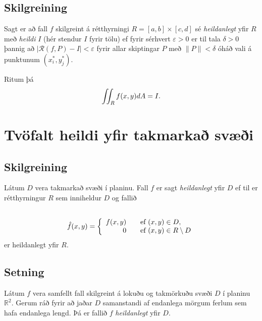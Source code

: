 \documentclass[a4paper,10pt,icelandic]{sphinxmanual}
\begin{document}
\subsection{Skilgreining}
\label{Kafli4:id2}
Sagt er að fall \(f\) skilgreint á rétthyrningi
\(R=[a,b]\times [c,d]\) sé \textit{heildanlegt} yfir \(R\) með \textit{heildi}
\(I\) (hér stendur \(I\) fyrir tölu) ef fyrir sérhvert
\(\varepsilon>0\) er til tala \(\delta>0\) þannig að
\(|\mathcal{R}(f,P)-I|<\varepsilon\) fyrir allar skiptingar
\(P\) með \(\|P\|<\delta\) óháð vali á punktunum
\((x_i^*, y_j^*)\).

Ritum þá
\begin{gather}
\begin{split}\displaystyle \int\!\!\!\int_R f(x,y)dA=I.\end{split}\notag
\end{gather}

\section{Tvöfalt heildi yfir takmarkað svæði}
\label{Kafli4:tvofalt-heildi-yfir-takmarka-svaei}

\subsection{Skilgreining}
\label{Kafli4:id3}
Látum \(D\) vera takmarkað svæði í planinu. Fall \(f\) er sagt
\textit{heildanlegt} yfir \(D\) ef til er rétthyrningur \(R\) sem
inniheldur \(D\) og fallið
\begin{gather}
\begin{split}\displaystyle\end{split}\notag\\\begin{split}\hat{f}(x,y)=\left\{\begin{array}{rcl}
f(x,y)& & \mbox{ef }(x,y)\in D,\\
0& & \mbox{ef }(x,y)\in R\setminus D
\end{array}\right.\end{split}\notag
\end{gather}
er heildanlegt yfir \(R\).


\subsection{Setning}
\label{Kafli4:setning}
Látum \(f\) vera samfellt fall skilgreint á lokuðu og takmörkuðu
svæði \(D\) í planinu \({\mathbb  R}^2\). Gerum ráð fyrir að
jaðar \(D\) samanstandi af endanlega mörgum ferlum sem hafa
endanlega lengd. Þá er fallið \(f\) \textit{heildanlegt} yfir \(D\).
\end{document}
